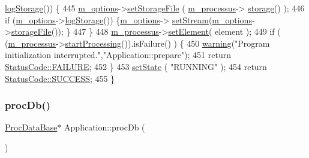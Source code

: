 \begin{DoxyCode}
      \hyperlink{classOptions_a33735fffe17485937ab7579d8716b7ee}{logStorage}()) \{
445     \hyperlink{classApplication_a3b0c74bf1ba99a5042990e3fefaa8963}{m\_options}->\hyperlink{classOptions_ac163281337998af5ca3b7a9617337fef}{setStorageFile} ( \hyperlink{classApplication_ab5eb4b3d3bef5ab9fce9c69401ce5786}{m\_processus}->
      \hyperlink{classProcessus_a33fa1a0b54a636e5cdd680669fd9ea51}{storage}() );
446     \textcolor{keywordflow}{if} (\hyperlink{classApplication_a3b0c74bf1ba99a5042990e3fefaa8963}{m\_options}->\hyperlink{classOptions_a33735fffe17485937ab7579d8716b7ee}{logStorage}()) \{\hyperlink{classApplication_a3b0c74bf1ba99a5042990e3fefaa8963}{m\_options}->
      \hyperlink{classOptions_af7df7a64e597f0bed79ca979f8144daa}{setStream}(\hyperlink{classApplication_a3b0c74bf1ba99a5042990e3fefaa8963}{m\_options}->\hyperlink{classOptions_a6661fe4edd501f7e97527b8f9354ef84}{storageFile}()); \}
447   \}
448   \hyperlink{classApplication_ab5eb4b3d3bef5ab9fce9c69401ce5786}{m\_processus}->\hyperlink{classProcessus_a8ddef94227d83d9dae2cd49aebc33353}{setElement}( element );
449   \textcolor{keywordflow}{if} ( (\hyperlink{classApplication_ab5eb4b3d3bef5ab9fce9c69401ce5786}{m\_processus}->\hyperlink{classProcessus_a09319bde9bed93e290f69b4e04585543}{startProcessing}()).isFailure() ) \{
450     \hyperlink{classObject_a65cd4fda577711660821fd2cd5a3b4c9}{warning}(\textcolor{stringliteral}{"Program initialization interrupted."},\textcolor{stringliteral}{"Application::prepare"});
451     \textcolor{keywordflow}{return} \hyperlink{classStatusCode_a6f565cbeadc76d14c72f047e5e85eb4ba3da73d4c469762eb9d3c960368252b26}{StatusCode::FAILURE};
452   \}
453   \hyperlink{classApplication_a4a86c9bbf7851753c7b2bc03211092fb}{setState} ( \textcolor{stringliteral}{"RUNNING"} );
454   \textcolor{keywordflow}{return} \hyperlink{classStatusCode_a6f565cbeadc76d14c72f047e5e85eb4badd0da38d3ba0d922efd1f4619bc37ad8}{StatusCode::SUCCESS};
455 \}
\end{DoxyCode}
\mbox{\label{classApplication_aa5c28af1a7e1c41dada2db2a4d03c57d}} 
\subsubsection{\texorpdfstring{proc\+Db()}{procDb()}}
{\footnotesize\ttfamily \hyperlink{classProcDataBase}{Proc\+Data\+Base}$\ast$ Application\+::proc\+Db (\begin{DoxyParamCaption}{ }\end{DoxyParamCaption})\hspace{0.3cm}{\ttfamily [inline]}}

